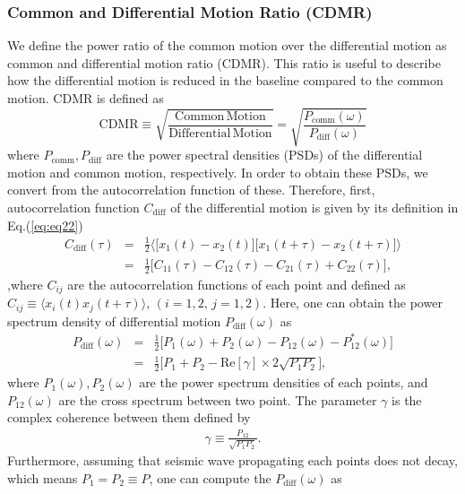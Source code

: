 \subsubsection{Common and Differential Motion Ratio (CDMR)}\label{sec:sec313}
We define the power ratio of the common motion over the differential motion as common and differential motion ratio (CDMR). This ratio is useful to describe how the differential motion is reduced in the baseline compared to the common motion. CDMR is defined as
\begin{equation}
  \mathrm{CDMR} \equiv \sqrt{\frac{\mathrm{Common\,Motion}}{\mathrm{Differential\,Motion}}} = \sqrt{\frac{P_{\mathrm{comm}}(\omega)}{P_{\mathrm{diff}}(\omega)}} \label{eq:eq23}
\end{equation}
where $P_{\mathrm{comm}},P_{\mathrm{diff}}$ are the power spectral densities (PSDs) of the differential motion and common motion, respectively. In order to obtain these PSDs, we convert from the autocorrelation function of these. Therefore, first, autocorrelation function $C_{\mathrm{diff}}$ of the differential motion is given by its definition in Eq.(\ref{eq:eq22})
\begin{eqnarray}
  C_{\mathrm{diff}}(\tau) &=& \frac{1}{2}
  \biggl\langle
  \biggl[ x_{1}(t)-x_{2}(t) \biggr] \biggl[ x_{1}(t+\tau)-x_{2}(t+\tau) \biggr]
  \biggr\rangle \\
  &=& \frac{1}{2}\biggl[ C_{11}(\tau) - C_{12}(\tau) - C_{21}(\tau) + C_{22}(\tau) \biggr], 
\end{eqnarray}
,where $C_{ij}$ are the autocorrelation functions of each point and defined as $ C_{ij} \equiv \langle x_{i}(t)x_{j}(t+\tau)\rangle,\, (i=1,2,\,j=1,2)$. Here, one can obtain the power spectrum density of differential motion $P_{\mathrm{diff}}(\omega)$ as 
\begin{eqnarray}
  P_{\mathrm{diff}}(\omega) &=& \frac{1}{2}\biggl[ P_{1}(\omega) + P_{2}(\omega) - P_{12}(\omega) - P_{12}^*(\omega) \biggr]\\
  &=& \frac{1}{2} \biggl[ P_{1}+P_{2} - \mathrm{Re}\left[\gamma \right]\times2\sqrt{P_{1}P_{2}} \biggr], \label{eq:eq31}
\end{eqnarray}
where $P_{1}(\omega),P_{2}(\omega)$ are the power spectrum densities of each points, and $P_{12}(\omega)$ are the cross spectrum between two point. The parameter $\gamma$ is the complex coherence between them defined by
\begin{eqnarray}
  \gamma \equiv \frac{P_{12}}{\sqrt{P_{1}P_{2}}}.
\end{eqnarray}
Furthermore, assuming that seismic wave propagating each points does not decay, which means $P_{1}=P_{2} \equiv P$, one can compute the $P_{\mathrm{diff}}(\omega)$ as 
